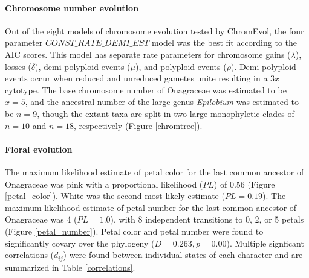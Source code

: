 \documentclass[review]{elsarticle}
\begin{document}
\paragraph{Chromosome number evolution}
Out of the eight models of chromosome evolution tested by ChromEvol,
the four parameter $CONST\_RATE\_DEMI\_EST$ model was the best fit according to the AIC scores. 
This model has separate rate parameters for
chromosome gains ($\lambda$),
losses ($\delta$),
demi-polyploid events ($\mu$),
and polyploid events ($\rho$).
Demi-polyploid events occur when reduced and unreduced gametes unite
resulting in a $3x$ cytotype.
The base chromosome number of Onagraceae was estimated to be $x=5$,
and the ancestral number of the large genus \textit{Epilobium} was estimated to be $n=9$,
though the extant taxa are split in two large monophyletic clades of 
$n=10$ and $n=18$, respectively (Figure \ref{chromtree}).

\paragraph{Floral evolution}
The maximum likelihood estimate of petal color for the 
last common ancestor of Onagraceae was pink 
with a proportional likelihood ($PL$) of $0.56$ (Figure \ref{petal_color}).
White was the second most likely estimate ($PL=0.19$).
The maximum likelihood estimate of petal number for the
last common ancestor of Onagraceae was 4 ($PL=1.0$), with 8
independent transitions to 0, 2, or 5 petals (Figure \ref{petal_number}).
Petal color and petal number were found to significantly covary over the 
phylogeny ($D=0.263, p=0.00$). Multiple signficant correlations
($d_{ij}$) were found between individual states of each character
and are summarized in Table \ref{correlations}.
\end{document}
